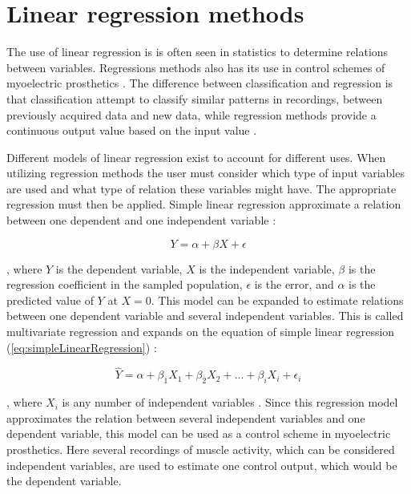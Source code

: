 \section{Linear regression methods}

The use of linear regression is is often seen in statistics to determine relations between variables. Regressions methods also has its use in control schemes of myoelectric prosthetics \cite{Hwang2017, Bruun2017, Hahne14}. The difference between classification and regression is that classification attempt to classify similar patterns in recordings, between previously acquired data and new data, while regression methods provide a continuous output value based on the input value \cite{Mendez2017, Hahne2014}. 

Different models of linear regression exist to account for different uses. When utilizing regression methods the user must consider which type of input variables are used and what type of relation these variables might have. The appropriate regression must then be applied. Simple linear regression approximate a relation between one dependent and one independent variable \cite{Zar2009}:

\begin{equation} \label{eq:simpleLinearRegression}
Y = \alpha + \beta X + \epsilon
\end{equation}

, where $Y$ is the dependent variable, $X$ is the independent variable, $\beta$ is the regression coefficient in the sampled population, $\epsilon$ is the error, and $\alpha$ is the predicted value of $Y$ at $X = 0$.
This model can be expanded to estimate relations between one dependent variable and several independent variables. This is called multivariate regression and expands on the equation of simple linear regression (\eqref{eq:simpleLinearRegression}) \cite{Zar2009}:

\begin{equation} \label{eq:multiLinearRegression}
\hat{Y} = \alpha + \beta_1 X_{1} + \beta_2 X_{2} + ... + \beta_i X_{i} + \epsilon_i
\end{equation} 

, where $X_i$ is any number of independent variables \cite{Zar2009}. Since this regression model approximates the relation between several independent variables and one dependent variable, this model can be used as a control scheme in myoelectric prosthetics. Here several recordings of muscle activity, which can be considered independent variables, are used to estimate one control output, which would be the dependent variable. \cite{Bruun2017}